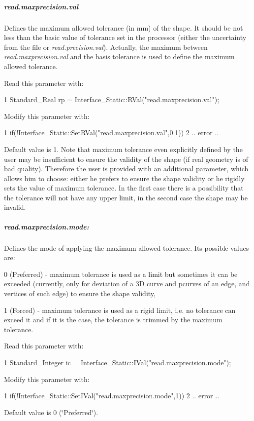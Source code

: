 \subparagraph*{read.\+maxprecision.\+val}

Defines the maximum allowed tolerance (in mm) of the shape. It should be not less than the basic value of tolerance set in the processor (either the uncertainty from the file or {\itshape read.\+precision.\+val}). Actually, the maximum between {\itshape read.\+maxprecision.\+val} and the basis tolerance is used to define the maximum allowed tolerance.

Read this parameter with\+: 
\begin{DoxyCode}
1 Standard\_Real rp = Interface\_Static::RVal("read.maxprecision.val"); 
\end{DoxyCode}
 Modify this parameter with\+: 
\begin{DoxyCode}
1 if(!Interface\_Static::SetRVal("read.maxprecision.val",0.1))  
2 .. error .. 
\end{DoxyCode}


Default value is 1. Note that maximum tolerance even explicitly defined by the user may be insufficient to ensure the validity of the shape (if real geometry is of bad quality). Therefore the user is provided with an additional parameter, which allows him to choose\+: either he prefers to ensure the shape validity or he rigidly sets the value of maximum tolerance. In the first case there is a possibility that the tolerance will not have any upper limit, in the second case the shape may be invalid.

\subparagraph*{read.\+maxprecision.\+mode\+:}

Defines the mode of applying the maximum allowed tolerance. Its possible values are\+:
\begin{DoxyItemize}
\item 0 (Preferred) -\/ maximum tolerance is used as a limit but sometimes it can be exceeded (currently, only for deviation of a 3D curve and pcurves of an edge, and vertices of such edge) to ensure the shape validity,
\item 1 (Forced) -\/ maximum tolerance is used as a rigid limit, i.\+e. no tolerance can exceed it and if it is the case, the tolerance is trimmed by the maximum tolerance.
\end{DoxyItemize}

Read this parameter with\+: 
\begin{DoxyCode}
1 Standard\_Integer ic = Interface\_Static::IVal("read.maxprecision.mode"); 
\end{DoxyCode}
 Modify this parameter with\+: 
\begin{DoxyCode}
1 if(!Interface\_Static::SetIVal("read.maxprecision.mode",1))  
2 .. error .. 
\end{DoxyCode}
 Default value is 0 (\char`\"{}\+Preferred\char`\"{}).

